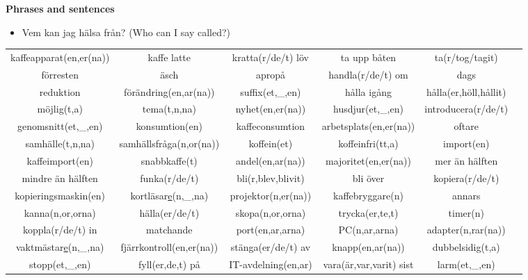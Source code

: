 
\begin{flushleft}
    \textbf{Phrases and sentences}
    \begin{itemize}
        \item Vem kan jag hälsa från? (Who can I say called?)
    \end{itemize}
\end{flushleft}

\begin{center}
    \begin{adjustwidth}{-2.4cm}{}
        \begin{tabular}{|c c c c c c|}
            \hline
            kaffeapparat(en,er(na)) & kaffe latte & kratta(r/de/t) löv & ta upp båten & ta(r/tog/tagit) &  \\
            förresten & äsch & apropå & handla(r/de/t) om & dags &  \\
            reduktion & förändring(en,ar(na)) & suffix(et,\_,en) & hålla igång & hålla(er,höll,hållit) &  \\
            möjlig(t,a) & tema(t,n,na) & nyhet(en,er(na)) & husdjur(et,\_,en) & introducera(r/de/t) &  \\
            genomsnitt(et,\_,en) & konsumtion(en) & kaffeconsumtion & arbetsplats(en,er(na)) & oftare &  \\
            samhälle(t,n,na) & samhällsfråga(n,or(na)) & koffein(et) & koffeinfri(tt,a) & import(en) &  \\
            kaffeimport(en) & snabbkaffe(t) & andel(en,ar(na)) & majoritet(en,er(na)) & mer än hälften &  \\
            mindre än hälften & funka(r/de/t) & bli(r,blev,blivit) & bli över & kopiera(r/de/t) &  \\
            kopieringsmaskin(en) & kortläsar\underline{e}(n,\_,na) & projektor(n,er(na)) & kaffebryggare(n) & annars &  \\
            kanna(n,or,orna) & hälla(er/de/t) & skopa(n,or,orna) & trycka(er,te,t) & timer(n) &  \\
            koppla(r/de/t) in & matchande & port(en,ar,arna) & PC(n,ar,arna) & adapter(n,rar(na)) &  \\
            vaktmästar\underline{e}(n,\_,na) & fjärrkontroll(en,er(na)) & stänga(er/de/t) av & knapp(en,ar(na)) & dubbelsidig(t,a) &  \\
            stopp(et,\_,en) & fyll(er,de,t) på & IT-avdelning(en,ar) & vara(är,var,varit) sist & larm(et,\_,en) &  \\

\end{tabular}
\end{adjustwidth}
\end{center}
